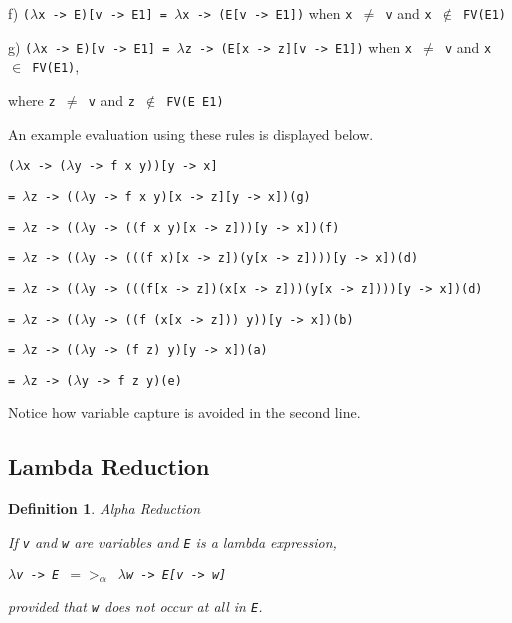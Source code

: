 \documentclass[11pt]{article}
\newtheorem{definition}{Definition}
\begin{document}
\hspace{1cm}f) \texttt{($\lambda$x -> E)[v -> E1] = $\lambda$x -> (E[v -> E1])} when \texttt{x $\neq$ v} and \texttt{x $\not\in$ FV(E1)}

\hspace{1cm}g) \texttt{($\lambda$x -> E)[v -> E1] = $\lambda$z -> (E[x -> z][v -> E1])} when \texttt{x $\neq$ v} and \texttt{x $\in$ FV(E1)},

\parskip 0pt
\hspace{10cm} where \texttt{z $\neq$ v} and \texttt{z $\not\in$ FV(E E1)}

\parskip 6pt
An example evaluation using these rules is displayed below. 

\hspace{1cm}\texttt{($\lambda$x -> ($\lambda$y -> f x y))[y -> x]}\parskip 0pt

\hspace{2cm}\texttt{= $\lambda$z -> (($\lambda$y -> f x y)[x -> z][y -> x])\hfill(g)}\parskip 0pt

\hspace{2cm}\texttt{= $\lambda$z -> (($\lambda$y -> ((f x y)[x -> z]))[y -> x])\hfill(f)}\parskip 0pt

\hspace{2cm}\texttt{= $\lambda$z -> (($\lambda$y -> (((f x)[x -> z])(y[x -> z])))[y -> x])\hfill(d)}\parskip 0pt

\hspace{2cm}\texttt{= $\lambda$z -> (($\lambda$y -> (((f[x -> z])(x[x -> z]))(y[x -> z])))[y -> x])\hfill(d)}\parskip 0pt

\hspace{2cm}\texttt{= $\lambda$z -> (($\lambda$y -> ((f (x[x -> z])) y))[y -> x])\hfill(b)}\parskip 0pt

\hspace{2cm}\texttt{= $\lambda$z -> (($\lambda$y -> (f z) y)[y -> x])\hfill(a)}\parskip 0pt

\hspace{2cm}\texttt{= $\lambda$z -> ($\lambda$y -> f z y)\hfill(e)}\parskip 6pt

Notice how variable capture is avoided in the second line.

\subsection{Lambda Reduction}

\begin{definition}{Alpha Reduction}

If \emph{\texttt{v}} and \emph{\texttt{w}} are variables and \emph{\texttt{E}} is a lambda expression,

\emph{\hspace{2cm}\texttt{$\lambda$v -> E $=>_{\alpha}$ $\lambda$w -> E[v -> w]}}

\hspace{1cm}provided that \emph{\texttt{w}} does not occur at all in \emph{\texttt{E}}.
\end{definition}
\end{document}
